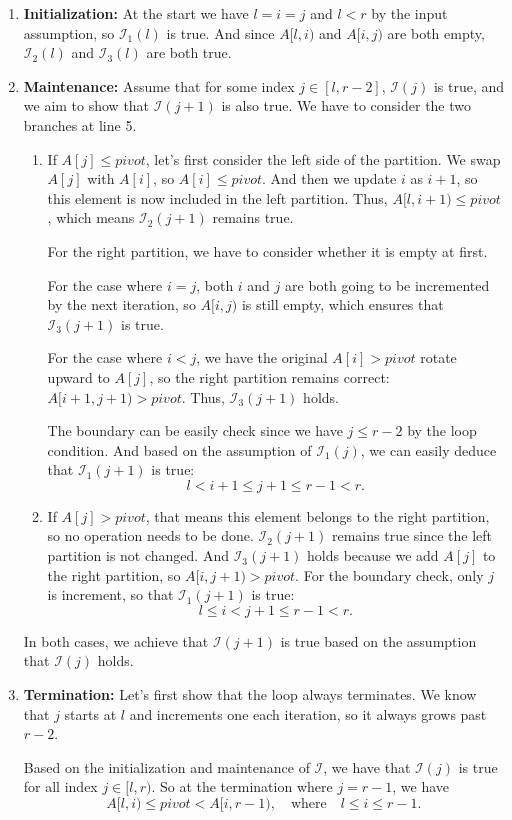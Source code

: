 \documentclass[12pt]{article}
\begin{document}
\begin{enumerate}
    \item \textbf{Initialization:}
    At the start we have \(l = i = j\) and \(l < r\) by the input assumption, so \(\mathcal{I}_1(l)\) is true. And since \(A[l, i)\) and \(A[i, j)\) are both empty, \(\mathcal{I}_2(l)\) and \(\mathcal{I}_3(l)\) are both true.

    \item \textbf{Maintenance:}
    Assume that for some index \(j \in [l, r-2]\), \(\mathcal{I}(j)\) is true, and we aim to show that \(\mathcal{I}(j+1)\) is also true.
    We have to consider the two branches at line 5.
    \begin{enumerate}
        \item If \(A[j] \leq pivot\), let's first consider the left side of the partition. We swap \(A[j]\) with \(A[i]\), so \(A[i] \leq pivot\). And then we update \(i\) as \(i + 1\), so this element is now included in the left partition. Thus, \(A[l, i+1) \leq pivot\), which means \(\mathcal{I}_2(j + 1)\) remains true.

        For the right partition, we have to consider whether it is empty at first.
        
        For the case where \(i = j\), both \(i\) and \(j\) are both going to be incremented by the next iteration, so \(A[i, j)\) is still empty, which ensures that \(\mathcal{I}_3(j+1)\) is true.

        For the case where \(i < j\), we have the original \(A[i] > pivot\) rotate upward to \(A[j]\), so the right partition remains correct: \(A[i+1, j+1) > pivot\). Thus, \(\mathcal{I}_3(j+1)\) holds.

        The boundary can be easily check since we have \(j \leq r - 2\) by the loop condition. And based on the assumption of \(\mathcal{I}_1(j)\), we can easily deduce that  \(\mathcal{I}_1(j+1)\) is true:
        \[
            l < i+1 \leq j+1 \leq r-1 < r.
        \]

        \item If \(A[j] > pivot\), that means this element belongs to the right partition, so no operation needs to be done. \(\mathcal{I}_2(j+1)\) remains true since the left partition is not changed. And \(\mathcal{I}_3(j+1)\) holds because we add \(A[j]\) to the right partition, so \(A[i, j+1) > pivot\). For the boundary check, only \(j\) is increment, so that \(\mathcal{I}_1(j+1)\) is true:
        \[
            l \leq i < j + 1 \leq r - 1 < r.
        \]
    \end{enumerate}
    In both cases, we achieve that \(\mathcal{I}(j+1)\) is true based on the assumption that \(\mathcal{I}(j)\) holds.
    \item \textbf{Termination:} Let's first show that the loop always terminates. We know that \(j\) starts at \(l\) and increments one each iteration, so it always grows past \(r - 2\).

    Based on the initialization and maintenance of \(\mathcal{I}\), we have that \(\mathcal{I}(j)\) is true for all index \(j \in [l, r)\). So at the termination where \(j = r-1\), we have
    \[
        A[l, i) \leq pivot < A[i, r-1), \quad \text{where} \quad l \leq i \leq r-1.
    \]
\end{enumerate}
\end{document}
